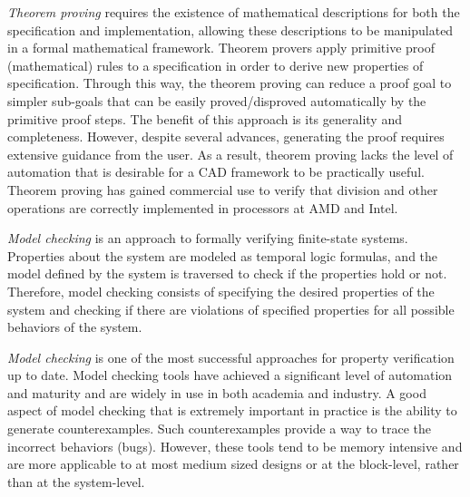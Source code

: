 {\it Theorem proving} \cite{theoremproving:91} requires the existence of mathematical descriptions for both the specification and 
implementation, allowing these descriptions to be manipulated in a formal mathematical framework.
Theorem provers apply primitive proof (mathematical) rules to a specification in order to derive new properties of specification. 
Through this way, the theorem proving can reduce a proof goal to simpler sub-goals 
that can be easily proved/disproved automatically by the primitive proof steps.
The benefit of this approach is its generality and
completeness. However, despite several advances, generating
the proof requires extensive guidance from the user. As a result,
theorem proving lacks the level of automation that is desirable for a
CAD framework to be practically useful.
Theorem proving has gained commercial use to verify that division and other operations are correctly implemented in processors at AMD and Intel.

{\it Model checking} \cite{modelcheck:99} is an approach to formally verifying finite-state systems. 
Properties about the system are modeled as temporal logic formulas, and the model defined by the system is 
traversed to check if the properties hold or not. Therefore, model checking consists of specifying the desired 
properties of the system and checking if there are violations of specified properties for all possible behaviors of the system.

{\it Model checking} is one of the most successful approaches for property verification up to date. 
Model checking tools \cite{BHEL96} \cite{SMV} \cite{spin} have achieved a
significant level of automation and maturity and are widely in use in
both academia and industry. A good aspect of model checking that is extremely important in practice is
the ability to generate counterexamples. Such counterexamples provide a way to
trace the incorrect behaviors (bugs). 
However, these tools tend to be memory
intensive and are more applicable to at most medium sized designs or at the
block-level, rather than at the system-level.


